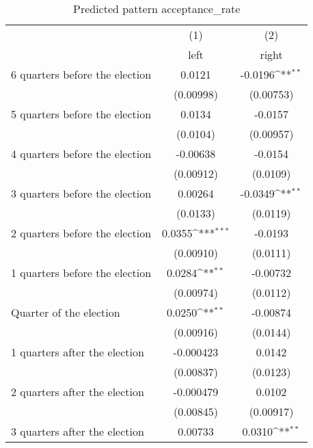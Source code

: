 \begin{table}[htbp]\centering
\def\sym#1{\ifmmode^{#1}\else\(^{#1}\)\fi}
\caption{Predicted pattern acceptance\_rate}
\begin{tabular}{l*{2}{c}}
\hline\hline
                    &\multicolumn{1}{c}{(1)}&\multicolumn{1}{c}{(2)}\\
                    &\multicolumn{1}{c}{left}&\multicolumn{1}{c}{right}\\
\hline
 6 quarters before the election&      0.0121         &     -0.0196\sym{**} \\
                    &   (0.00998)         &   (0.00753)         \\
[1em]
 5 quarters before the election&      0.0134         &     -0.0157         \\
                    &    (0.0104)         &   (0.00957)         \\
[1em]
 4 quarters before the election&    -0.00638         &     -0.0154         \\
                    &   (0.00912)         &    (0.0109)         \\
[1em]
 3 quarters before the election&     0.00264         &     -0.0349\sym{**} \\
                    &    (0.0133)         &    (0.0119)         \\
[1em]
 2 quarters before the election&      0.0355\sym{***}&     -0.0193         \\
                    &   (0.00910)         &    (0.0111)         \\
[1em]
 1 quarters before the election&      0.0284\sym{**} &    -0.00732         \\
                    &   (0.00974)         &    (0.0112)         \\
[1em]
Quarter of the election&      0.0250\sym{**} &    -0.00874         \\
                    &   (0.00916)         &    (0.0144)         \\
[1em]
 1 quarters after the election&   -0.000423         &      0.0142         \\
                    &   (0.00837)         &    (0.0123)         \\
[1em]
 2 quarters after the election&   -0.000479         &      0.0102         \\
                    &   (0.00845)         &   (0.00917)         \\
[1em]
 3 quarters after the election&     0.00733         &      0.0310\sym{**} \\

\end{tabular}
\end{table}
